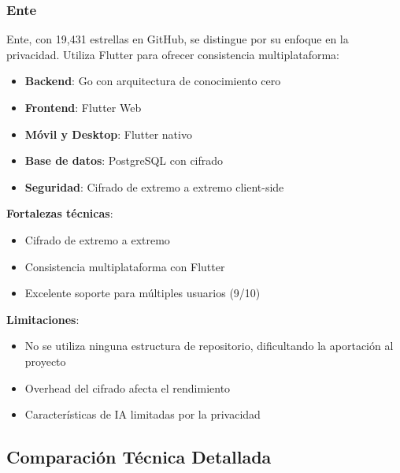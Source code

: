 \subsubsection{Ente}

Ente, con 19,431 estrellas en GitHub, se distingue por su enfoque en la privacidad. Utiliza Flutter para ofrecer consistencia multiplataforma:

\begin{itemize}
    \item \textbf{Backend}: Go con arquitectura de conocimiento cero
    \item \textbf{Frontend}: Flutter Web
    \item \textbf{Móvil y Desktop}: Flutter nativo
    \item \textbf{Base de datos}: PostgreSQL con cifrado
    \item \textbf{Seguridad}: Cifrado de extremo a extremo client-side
\end{itemize}

\textbf{Fortalezas técnicas}:
\begin{itemize}
    \item Cifrado de extremo a extremo
    \item Consistencia multiplataforma con Flutter
    \item Excelente soporte para múltiples usuarios (9/10)
\end{itemize}

\textbf{Limitaciones}:
\begin{itemize}
    \item No se utiliza ninguna estructura de repositorio, dificultando la aportación al proyecto
    \item Overhead del cifrado afecta el rendimiento
    \item Características de IA limitadas por la privacidad
\end{itemize}

\subsection{Comparación Técnica Detallada}


